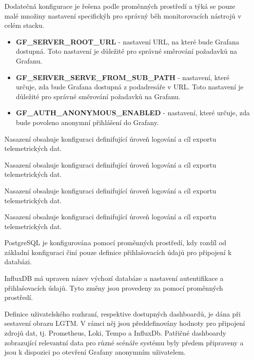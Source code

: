 Dodatečná konfigurace je řešena podle proměnných prostředí a týká se pouze malé množiny nastavení specifickýh pro správný běh monitorovacích nástrojů v celém stacku.

\begin{itemize}
    \item \textbf{GF\_SERVER\_ROOT\_URL} - nastavení URL, na které bude Grafana dostupná. Toto nastavení je důležité pro správné směrování požadavků na Grafanu.
    \item \textbf{GF\_SERVER\_SERVE\_FROM\_SUB\_PATH} - nastavení, které určuje, zda bude Grafana dostupná z podadresáře v URL. Toto nastavení je důležité pro správné směrování požadavků na Grafanu.
    \item \textbf{GF\_AUTH\_ANONYMOUS\_ENABLED} - nastavení, které určuje, zda bude povoleno anonymní přihlášení do Grafany.
\end{itemize}



Nasazení obsahuje konfiguraci definifující úroveň logování a cíl exportu telemetrických dat.


Nasazení obsahuje konfiguraci definifující úroveň logování a cíl exportu telemetrických dat.


Nasazení obsahuje konfiguraci definifující úroveň logování a cíl exportu telemetrických dat.


Nasazení obsahuje konfiguraci definifující úroveň logování a cíl exportu telemetrických dat.



PostgreSQL je konfigurována pomocí proměnných prostředí, kdy rozdíl od základní konfiguraci činí pouze definice přihlašovacích údajů pro připojení k databázi.


InfluxDB má upraven název výchozí databáze a nastavení autentifikace a přihlašovacích údajů. Tyto změny jsou provedeny za pomocí proměnných prostředí.


Definice uživatelského rozhraní, respektive dostupných dashboardů, je dána při sestavení obrazu LGTM. V rámci něj jsou předdefinovány hodnoty pro připojení zdrojů dat, tj. Prometheus, Loki, Tempo a InfluxDb. Patřičné dashboardy zobrazující relevantní data pro různé scénáře systému byly předem připraveny a jsou k dispozici po otevření Grafany anonymním uživatelem.


